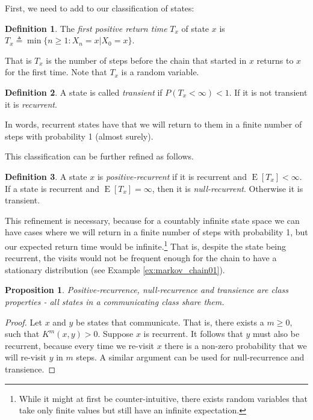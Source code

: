 \documentclass{book}
\theoremstyle{plain}%
\newtheorem{proposition}{Proposition}[section]
\theoremstyle{definition}
\newtheorem{definition}{Definition}[section]
\DeclareMathOperator{\E}{E}
\begin{document}
First, we need to add to our classification of states:

\begin{definition} The \emph{first positive return time} $T_x$ of state $x$ is $T_x \triangleq \min\{n \geq 1: X_n = x | X_0 = x\}$.
\end{definition}

That is $T_x$ is the number of steps before the chain that started in $x$ returns to $x$ for the first time. Note that $T_x$ is a random variable.

\begin{definition} A state is called \emph{transient} if $P(T_x < \infty ) < 1$. If it is not transient it is \emph{recurrent}.
\end{definition}

In words, recurrent states have that we will return to them in a finite number of steps with probability 1 (almost surely).

This classification can be further refined as follows.

\begin{definition} A state $x$ is \emph{positive-recurrent} if it is recurrent and $\E[T_x] < \infty$. If a state is recurrent and $\E[T_x] = \infty$, then it is \emph{null-recurrent}. Otherwise it is transient.
\end{definition}

This refinement is necessary, because for a countably infinite state space we can have cases where we will return in a finite number of steps with probability 1, but our expected return time would be infinite.\footnote{While it might at first be counter-intuitive, there exists random variables that take only finite values but still have an infinite expectation.} That is, despite the state being recurrent, the visits would not be frequent enough for the chain to have a stationary distribution (see Example \ref{ex:markov_chain01}).

\begin{proposition} Positive-recurrence, null-recurrence and transience are class properties - all states in a communicating class share them. 
\end{proposition}

\begin{proof} Let $x$ and $y$ be states that communicate. That is, there exists a $m \geq 0$, such that $K^m(x, y) > 0$. Suppose $x$ is recurrent. It follows that $y$ must also be recurrent, because every time we re-visit $x$ there is a non-zero probability that we will re-visit $y$ in $m$ steps. A similar argument can be used for null-recurrence and transience.
\end{proof}
\end{document}
